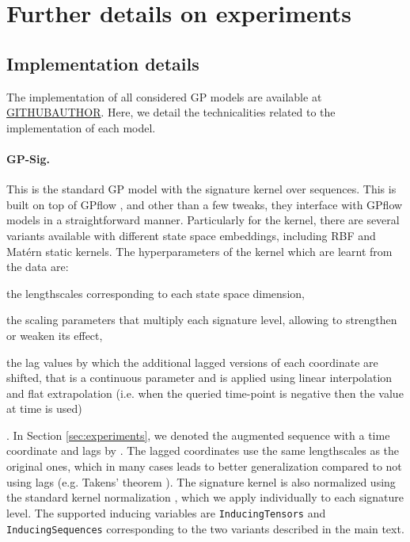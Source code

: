\documentclass{article}
\begin{document}
\section{Further details on experiments}    

\subsection{Implementation details} \label{app:implementation}
The implementation of all considered GP models are available at \url{GITHUBAUTHOR}. Here, we detail the technicalities related to the implementation of each model.

\paragraph{GP-Sig.} This is the standard GP model with the signature kernel over sequences. This is built on top of GPflow \cite{Matthews2017GPflowAG}, and other than a few tweaks, they interface with GPflow models in a straightforward manner. Particularly for the kernel, there are several variants available with different state space embeddings, including RBF and Matérn static kernels. The hyperparameters of the kernel which are learnt from the data are: \begin{enumerate*}[label=(\arabic*)] \item the lengthscales corresponding to each state space dimension, \item the scaling parameters that multiply each signature level, allowing to strengthen or weaken its effect, \item the lag values by which the additional lagged versions of each coordinate are shifted, that is a continuous parameter and is applied using linear interpolation and flat extrapolation (i.e. when the queried time-point is negative then the value at time  is used) \end{enumerate*}. In Section \ref{sec:experiments}, we denoted the augmented sequence with a time coordinate and  lags by . The lagged coordinates use the same lengthscales as the original ones, which in many cases leads to better generalization compared to not using lags (e.g. Takens' theorem \cite{takens1981detecting}).
The signature kernel is also normalized using the standard kernel normalization , which we apply individually to each signature level. The supported inducing variables are \texttt{InducingTensors} and \texttt{InducingSequences} corresponding to the two variants described in the main text.
\end{document}
